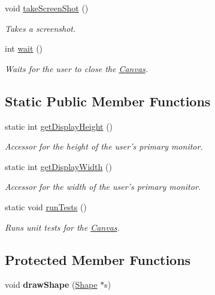 \begin{DoxyCompactItemize}
void \hyperlink{classtsgl_1_1_canvas_ac035f43763b198f6915a0772973a5ea9}{take\-Screen\-Shot} ()
\begin{DoxyCompactList}\small\item\em Takes a screenshot. \end{DoxyCompactList}\item 
int \hyperlink{classtsgl_1_1_canvas_a39e69fd4d1ad8cf0e22ecea12f1ddf08}{wait} ()
\begin{DoxyCompactList}\small\item\em Waits for the user to close the \hyperlink{classtsgl_1_1_canvas}{Canvas}. \end{DoxyCompactList}\end{DoxyCompactItemize}
\subsection*{Static Public Member Functions}
\begin{DoxyCompactItemize}
\item 
static int \hyperlink{classtsgl_1_1_canvas_a664b101f972845eaf5fdc4d9e664e623}{get\-Display\-Height} ()
\begin{DoxyCompactList}\small\item\em Accessor for the height of the user's primary monitor. \end{DoxyCompactList}\item 
static int \hyperlink{classtsgl_1_1_canvas_abbe5c392cac2320fecf1f2751afb207c}{get\-Display\-Width} ()
\begin{DoxyCompactList}\small\item\em Accessor for the width of the user's primary monitor. \end{DoxyCompactList}\item 
\hypertarget{classtsgl_1_1_canvas_a3365d92635f650cca2eda69812bef60b}{static void \hyperlink{classtsgl_1_1_canvas_a3365d92635f650cca2eda69812bef60b}{run\-Tests} ()}\label{classtsgl_1_1_canvas_a3365d92635f650cca2eda69812bef60b}

\begin{DoxyCompactList}\small\item\em Runs unit tests for the \hyperlink{classtsgl_1_1_canvas}{Canvas}. \end{DoxyCompactList}\end{DoxyCompactItemize}
\subsection*{Protected Member Functions}
\begin{DoxyCompactItemize}
\item 
\hypertarget{classtsgl_1_1_canvas_a560e3f64f3b2e5a7af8a8d7b92d8e660}{void {\bfseries draw\-Shape} (\hyperlink{classtsgl_1_1_shape}{Shape} $\ast$s)}\label{classtsgl_1_1_canvas_a560e3f64f3b2e5a7af8a8d7b92d8e660}

\end{DoxyCompactItemize}
